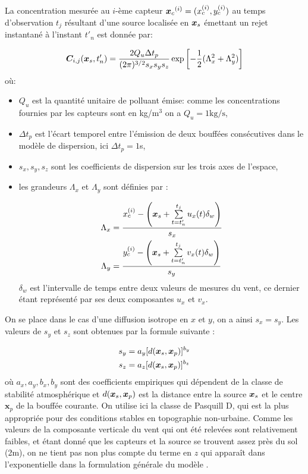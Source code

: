  La concentration mesurée au $i$-ème capteur ${\bm{x}_c}^{(i)} = (x_c^{(i)}, y_c^{(i)})$ au temps d'observation $t_j$ résultant d'une source localisée en ${\bm{x}_s}$ émettant un rejet instantané à l'instant $t'_n$ est donnée par: 
 
 \begin{equation}
 {\bm{C}}_{i,j}({\bm{x}_s}, t'_n) = \dfrac{2Q_u\Delta t_p}{(2\pi)^{3/2}s_x s_y s_z}\exp\left[-\dfrac{1}{2}(\Lambda_x^2 + \Lambda_y^2)\right]
 \label{eq_AE_27}
 \end{equation}
 où:
 \begin{itemize}
 	\item $Q_u$ est la quantité unitaire de polluant émise: comme les concentrations fournies par les capteurs sont en kg/m$^3$ on a $Q_u = 1\text{kg/s}$,
 	\item $\Delta t_p$ est l'écart temporel entre l'émission de deux bouffées consécutives dans le modèle de dispersion, ici $\Delta t_p = 1$s,
 	\item $s_x, s_y, s_z$ sont les coefficients de dispersion sur les trois axes de l'espace,
 	\item les grandeurs $\Lambda_x$ et $\Lambda_y$ sont définies par : 
 	
 	\begin{equation}
 	\begin{split}
 	\Lambda_x &= \dfrac{x_c^{(i)} - \left({\bm{x}_s} + \sum\limits_{t=t'_n}^{t_j}u_x(t)\delta_w\right)}{s_x}\\
 	 	\Lambda_y &= \dfrac{y_c^{(i)} - \left({\bm{x}_s} + \sum\limits_{t=t'_n}^{t_j}v_x(t)\delta_w\right)}{s_y}
 	\end{split}
 	\end{equation}
 	$\delta_w$ est l'intervalle de temps entre deux valeurs de mesures du vent, ce dernier étant représenté par ses deux composantes $u_x$ et $v_x$.
 \end{itemize}
 
 On se place dans le cas d'une diffusion isotrope en $x$ et $y$, on a ainsi $s_x = s_y$. Les valeurs de $s_y$ et $s_z$ sont obtenues par la formule suivante : 
 
 \begin{equation}
 \begin{split}
 s_y &= a_y [d({\bm{x}_s}, \bm{x}_p)]^{b_y}\\
 s_z &= a_z [d({\bm{x}_s}, \bm{x}_p)]^{b_z}
 \end{split}
 \end{equation}
 où $a_x, a_y, b_x, b_y$ sont des coefficients empiriques qui dépendent de la classe de stabilité atmosphérique \cite{Pasquill1983} et $d({\bm{x}_s}, \bm{x}_p)$ est la distance entre la source ${\bm{x}_s}$ et le centre $\bm{x}_p$ de la bouffée courante. On utilise ici la classe de Pasquill D, qui est la plus appropriée pour des conditions stables en topographie non-urbaine. 
 Comme les valeurs de la composante verticale du vent qui ont été relevées sont relativement faibles, et étant donné que les capteurs et la source se trouvent assez près du sol (2m), on ne tient pas non plus compte du terme en $z$ qui apparaît dans l'exponentielle dans la formulation générale du modèle .

